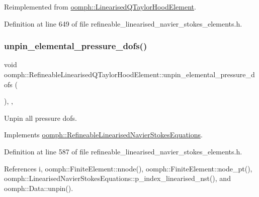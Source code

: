 Reimplemented from \hyperlink{classoomph_1_1LinearisedQTaylorHoodElement_ad91af0bc54b6c61cf43cbf867e939bc9}{oomph\+::\+Linearised\+Q\+Taylor\+Hood\+Element}.



Definition at line 649 of file refineable\+\_\+linearised\+\_\+navier\+\_\+stokes\+\_\+elements.\+h.

\mbox{\label{classoomph_1_1RefineableLinearisedQTaylorHoodElement_a42718cd6cb563e4a07b886ade967c8a2}} 
\subsubsection{\texorpdfstring{unpin\+\_\+elemental\+\_\+pressure\+\_\+dofs()}{unpin\_elemental\_pressure\_dofs()}}
{\footnotesize\ttfamily void oomph\+::\+Refineable\+Linearised\+Q\+Taylor\+Hood\+Element\+::unpin\+\_\+elemental\+\_\+pressure\+\_\+dofs (\begin{DoxyParamCaption}{ }\end{DoxyParamCaption})\hspace{0.3cm}{\ttfamily [inline]}, {\ttfamily [private]}, {\ttfamily [virtual]}}



Unpin all pressure dofs. 



Implements \hyperlink{classoomph_1_1RefineableLinearisedNavierStokesEquations_adb7699bbdef97e298a775f5f43b1f2a6}{oomph\+::\+Refineable\+Linearised\+Navier\+Stokes\+Equations}.



Definition at line 587 of file refineable\+\_\+linearised\+\_\+navier\+\_\+stokes\+\_\+elements.\+h.



References i, oomph\+::\+Finite\+Element\+::nnode(), oomph\+::\+Finite\+Element\+::node\+\_\+pt(), oomph\+::\+Linearised\+Navier\+Stokes\+Equations\+::p\+\_\+index\+\_\+linearised\+\_\+nst(), and oomph\+::\+Data\+::unpin().

\mbox{\label{classoomph_1_1RefineableLinearisedQTaylorHoodElement_afe6944d2b619253c840a326460f32eaa}} 
